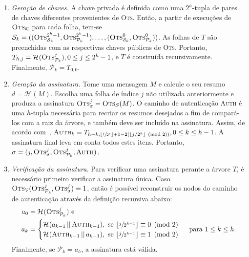 \documentclass[12pt]{report}
\newcommand{\pk}{\mathcal{P}_k}
\newcommand{\sk}{\mathcal{S}_k}
\newcommand{\hash}[2][]{\mathcal{H}^{#1}(#2)}
\newcommand{\concat}{\, \vert \vert \,}
\begin{document}
\begin{enumerate}

  \item[] \emph{Geração de chaves.} A chave privada é definida como uma
      $2^{h}$-tupla de pares de chaves diferentes provenientes de \textsc{Ots}.
        Então, a partir de execuções de $\textsc{Ots}_\mathcal{K}$ para cada
        folha, tem-se $\sk{} = ((\textsc{Ots}_{\sk{}}^{2^{h} - 1},
        \textsc{Ots}_{\pk{}}^{2^{h} - 1}), \dots, (\textsc{Ots}_{\sk{}}^{0},
        \textsc{Ots}_{\pk{}}^{0}))$. As folhas de $T$ são preenchidas com as
        respectivas chaves públicas de \textsc{Ots}. Portanto, $T_{h, j} =
        \hash{\textsc{Ots}_{\pk{}}^{j}}, 0 \leq j \leq 2^{h} - 1$,
        e $T$ é construída recursivamente. Finalmente, $\pk{} = T_{0,0}$.

  \item[] \emph{Geração da assinatura.} Tome uma mensagem $M$ e calcule o seu
      resumo $d = \hash{M}$. Escolha uma folha de índice $j$ não utilizada
        anteriormente e produza a assinatura $\textsc{Ots}_\sigma^{j} =
        \textsc{Ots}_\mathcal{S}(M)$. O caminho de autenticação \textsc{Auth} é
        uma $h$-tupla necessária para recriar os resumos desejados a fim de
        compará-los com a raiz da árvore, e também deve ser incluído na
        assinatura. Assim, de acordo com~\cite{Bernstein:2008:PQC:1522375},
        $\textsc{Auth}_k = T_{h - k, \lfloor \sfrac{j}{2^k} \rfloor + 1 - 2
        (\lfloor j/2^k \rfloor \pmod{2})}, 0 \leq k \leq h - 1$. A assinatura
        final leva em conta todos estes itens. Portanto, $\sigma = (j,
        \textsc{Ots}_\sigma^{j}, \textsc{Ots}_{\pk{}}^{j}, \textsc{Auth})$.

  \item[] \emph{Verificação da assinatura.} Para verificar uma assinatura
      perante a árvore $T$, é necessário primeiro verificar a assinatura única.
        Caso $\textsc{Ots}_{\mathcal{V}}(\textsc{Ots}_{\pk{}}^{j},
        \textsc{Ots}_{\sigma}^{j}) = 1$, então é possível reconstruir os nodos
        do caminho de autenticação através da definição recursiva abaixo:
        \begin{equation}
          \begin{split}
            a_{0} &= \hash{\textsc{Ots}_{\pk{}}^{j}} \text{ e } \\
            a_{k} &=
            \begin{cases}
              \hash{a_{k - 1} \concat \textsc{Auth}_{k - 1}}, \text{ se }
                \lfloor \sfrac{j}{2^{k - 1}} \rfloor \equiv 0 \pmod{2} \\
              \hash{\textsc{Auth}_{k - 1} \concat a_{k - 1}}, \text{ se }
                \lfloor \sfrac{j}{2^{k - 1}} \rfloor \equiv 1 \pmod{2} \\
            \end{cases} \text{ para } 1 \leq k \leq h.
          \end{split}
        \end{equation}
        Finalmente, se $\pk{} = a_{h}$, a assinatura está válida.

\end{enumerate}
\end{document}

